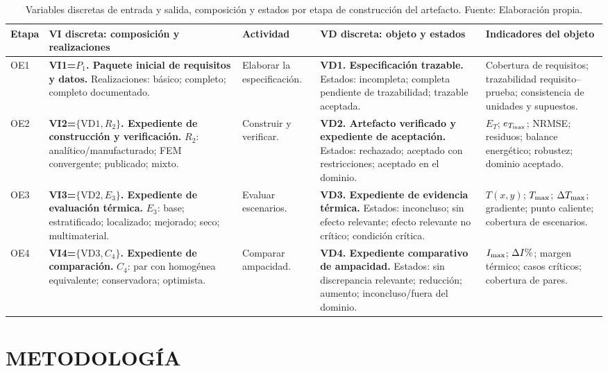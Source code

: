 \begin{table}[htbp]
\centering
\caption{Variables discretas de entrada y salida, composición y estados por etapa de construcción del artefacto. Fuente: Elaboración propia.}
\label{tab:dimensiones-operativas}
\begingroup
\scriptsize
\setlength{\tabcolsep}{3pt}
\renewcommand{\arraystretch}{1.35}
\begin{tabularx}{\textwidth}{L{1.05cm}L{4.25cm}L{2.05cm}L{4.25cm}Y}
\toprule
\textbf{Etapa} & \textbf{VI discreta: composición y realizaciones} & \textbf{Actividad} & \textbf{VD discreta: objeto y estados} & \textbf{Indicadores del objeto} \\
\midrule
OE1 & \textbf{VI1=$P_1$. Paquete inicial de requisitos y datos.} Realizaciones: básico; completo; completo documentado. & Elaborar la especificación. & \textbf{VD1. Especificación trazable.} Estados: incompleta; completa pendiente de trazabilidad; trazable aceptada. & Cobertura de requisitos; trazabilidad requisito--prueba; consistencia de unidades y supuestos. \\
OE2 & \textbf{VI2=$\{\mathrm{VD1},R_2\}$. Expediente de construcción y verificación.} $R_2$: analítico/manufacturado; FEM convergente; publicado; mixto. & Construir y verificar. & \textbf{VD2. Artefacto verificado y expediente de aceptación.} Estados: rechazado; aceptado con restricciones; aceptado en el dominio. & $E_T$; $e_{T_{\max}}$; NRMSE; residuos; balance energético; robustez; dominio aceptado. \\
OE3 & \textbf{VI3=$\{\mathrm{VD2},E_3\}$. Expediente de evaluación térmica.} $E_3$: base; estratificado; localizado; mejorado; seco; multimaterial. & Evaluar escenarios. & \textbf{VD3. Expediente de evidencia térmica.} Estados: inconcluso; sin efecto relevante; efecto relevante no crítico; condición crítica. & $T(x,y)$; $T_{\max}$; $\Delta T_{\max}$; gradiente; punto caliente; cobertura de escenarios. \\
OE4 & \textbf{VI4=$\{\mathrm{VD3},C_4\}$. Expediente de comparación.} $C_4$: par con homogénea equivalente; conservadora; optimista. & Comparar ampacidad. & \textbf{VD4. Expediente comparativo de ampacidad.} Estados: sin discrepancia relevante; reducción; aumento; inconcluso/fuera del dominio. & $I_{\max}$; $\Delta I\pct$; margen térmico; casos críticos; cobertura de pares. \\
\bottomrule
\end{tabularx}
\endgroup
\end{table}

\section{METODOLOGÍA}
\label{sec:metodologia}


